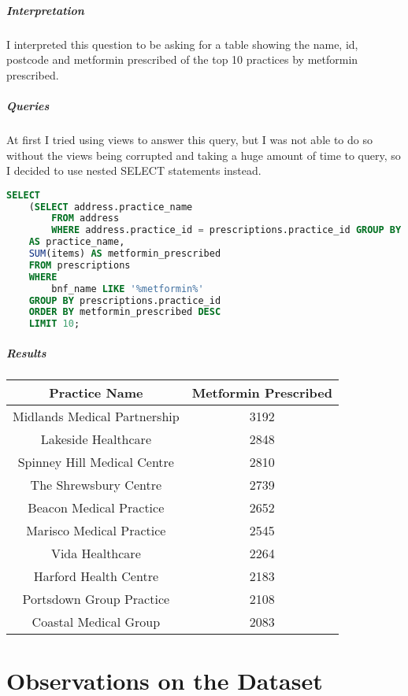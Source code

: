 \documentclass{report}
\begin{document}
\paragraph{Interpretation}
I interpreted this question to be asking for a table showing the name, id, postcode and metformin prescribed of the top 10 practices by metformin prescribed.
\paragraph{Queries}
At first I tried using views to answer this query, but I was not able to do so without the views being corrupted and taking a huge amount of time to query, so I decided to use nested SELECT statements instead.
\begin{lstlisting}[language=SQL, caption=Question 6 query]
SELECT 
	(SELECT address.practice_name 
		FROM address 
		WHERE address.practice_id = prescriptions.practice_id GROUP BY practice_id) 
	AS practice_name, 
	SUM(items) AS metformin_prescribed 
	FROM prescriptions 
	WHERE 
		bnf_name LIKE '%metformin%' 
	GROUP BY prescriptions.practice_id 
	ORDER BY metformin_prescribed DESC 
	LIMIT 10;
\end{lstlisting}
\paragraph{Results}
\begin{center}
\begin{tabular}{ | c | c | }
\hline
Practice Name & Metformin Prescribed \\
\hline
Midlands Medical Partnership & 3192 \\
\hline
Lakeside Healthcare & 2848 \\
\hline
Spinney Hill Medical Centre & 2810 \\
\hline
The Shrewsbury Centre & 2739 \\
\hline
Beacon Medical Practice & 2652 \\
\hline
Marisco Medical Practice & 2545 \\
\hline
Vida Healthcare & 2264 \\
\hline
Harford Health Centre & 2183 \\
\hline
Portsdown Group Practice & 2108 \\
\hline
Coastal Medical Group & 2083 \\
\hline
\end{tabular}
\end{center}

\chapter{Observations on the Dataset}
\end{document}
